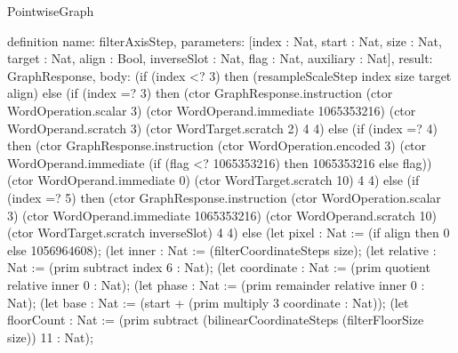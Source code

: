 \begin{lexlean}{PointwiseGraph}
\begin{semanticmodule}
definition{
  name: filterAxisStep,
  parameters: [index : Nat, start : Nat, size : Nat, target : Nat, align : Bool, inverseSlot : Nat, flag : Nat, auxiliary : Nat],
  result: GraphResponse,
  body: (if (index <? 3) then (resampleScaleStep index size target align) else (if (index =? 3) then (ctor GraphResponse.instruction (ctor WordOperation.scalar 3) (ctor WordOperand.immediate 1065353216) (ctor WordOperand.scratch 3) (ctor WordTarget.scratch 2) 4 4) else (if (index =? 4) then (ctor GraphResponse.instruction (ctor WordOperation.encoded 3) (ctor WordOperand.immediate (if (flag <? 1065353216) then 1065353216 else flag)) (ctor WordOperand.immediate 0) (ctor WordTarget.scratch 10) 4 4) else (if (index =? 5) then (ctor GraphResponse.instruction (ctor WordOperation.scalar 3) (ctor WordOperand.immediate 1065353216) (ctor WordOperand.scratch 10) (ctor WordTarget.scratch inverseSlot) 4 4) else (let pixel : Nat := (if align then 0 else 1056964608);
      (let inner : Nat := (filterCoordinateSteps size);
      (let relative : Nat := (prim subtract index 6 : Nat);
      (let coordinate : Nat := (prim quotient relative inner 0 : Nat);
      (let phase : Nat := (prim remainder relative inner 0 : Nat);
      (let base : Nat := (start + (prim multiply 3 coordinate : Nat));
      (let floorCount : Nat := (prim subtract (bilinearCoordinateSteps (filterFloorSize size)) 11 : Nat);
}
\end{semanticmodule}
\end{lexlean}
